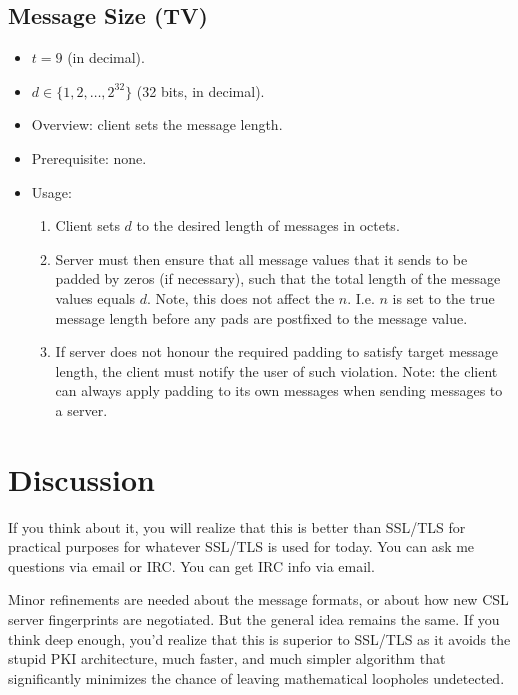 \documentclass{article}
\begin{document}
\subsection{Message Size (TV)}
\begin{itemize}
    \item $t = 9$ (in decimal).
    \item $d \in \{1,2,\ldots,2^{32}\}$ (32 bits, in decimal).
    \item Overview: client sets the message length.
    \item Prerequisite: none.
    \item Usage:
        \begin{enumerate}
            \item Client sets $d$ to the desired length of messages in octets.
            \item Server must then ensure that all message values that it sends
            to be padded by zeros (if necessary), such that the total length of
            the message values equals $d$. Note, this does not affect the $n$.
            I.e. $n$ is set to the true message length before any pads are
            postfixed to the message value.
            \item If server does not honour the required padding to satisfy
            target message length, the client must notify the user of such
            violation. Note: the client can always apply padding to its own
            messages when sending messages to a server.
        \end{enumerate}
\end{itemize}

\section{Discussion}
If you think about it, you will realize that this is better than SSL/TLS for
practical purposes for whatever SSL/TLS is used for today. You can ask me
questions via email or IRC. You can get IRC info via email.

Minor refinements are needed about the message formats, or
about how new CSL server fingerprints are negotiated. But the general idea
remains the same. If you think deep enough, you'd realize that this is superior
to SSL/TLS as it avoids the stupid PKI architecture, much faster, and much
simpler algorithm that significantly minimizes the chance of leaving
mathematical loopholes undetected.
\end{document}
